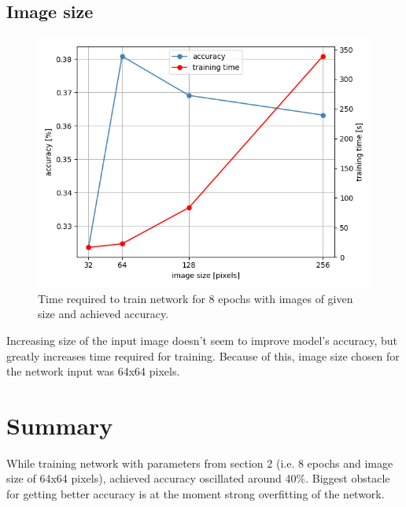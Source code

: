 	\subsection{Image size}
		\begin{figure}[h!]
			\centering
			\includegraphics[width = \textwidth]{img/sizes}
			\caption{Time required to train network for 8 epochs with images of given size and achieved accuracy.}					
		\end{figure}
		Increasing size of the input image doesn't seem to improve model's accuracy, but greatly increases time required for training.
		Because of this, image size chosen for the network input was 64x64 pixels.
\section{Summary}
	While training network with parameters from section 2 (i.e. 8 epochs and image size of 64x64 pixels), achieved accuracy oscillated around 40\%.
	Biggest obstacle for getting better accuracy is at the moment strong overfitting of the network.
